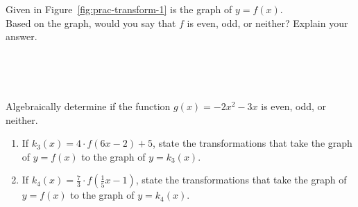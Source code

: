 \newpage


\begin{myPractice}
Given in Figure~\ref{fig:prac-transform-1} is the graph of $y=f(x)$.  \\
Based on the graph, would you say that $f$ is even, odd, or neither? Explain your answer.\\
\begin{minipage}{0.4\linewidth}
	\begin{center}
	~\\[-0.8em]
		\label{fig:prac-transform-1}
	\end{center}
\end{minipage}
~\\
\end{myPractice}


\begin{myPractice}
Algebraically determine if the function $g(x) = -2x^2-3x$ is even, odd, or neither.
\vfill
\vfill
\end{myPractice}



\begin{myPractice}
\begin{enumerate}
\item If $k_3(x) = 4\cdot f(6x-2)+5$, state the transformations that take the graph of $y=f(x)$ to the graph of $y=k_3(x)$.
\vfill

\item If $k_4(x) =  \frac{7}{3}\cdot f(\frac{1}{5}x-1)$, state the transformations that take the graph of $y=f(x)$ to the graph of $y=k_4(x)$.
\vfill
\end{enumerate}
\end{myPractice}




